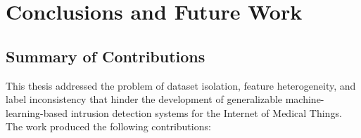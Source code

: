 \chapter{Conclusions and Future Work}
\label{ch:conclusions}

\section{Summary of Contributions}
\label{sec:contributions}

This thesis addressed the problem of dataset isolation, feature heterogeneity, and label inconsistency that hinder the development of generalizable machine-learning-based intrusion detection systems for the Internet of Medical Things. The work produced the following contributions:

